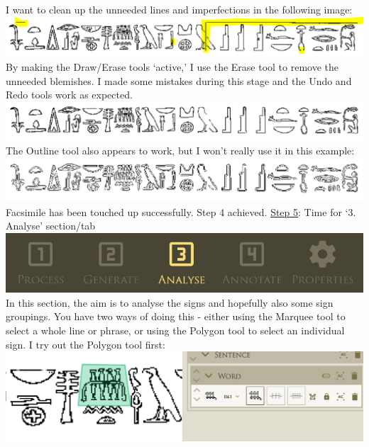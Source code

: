 \documentclass{article}
\begin{document}
\newline \break \noindent
I want to clean up the unneeded lines and imperfections in the following image:
\newline \break
\includegraphics[width=1.0\textwidth]{hiero_8.PNG}
By making the Draw/Erase tools `active,' I use the Erase tool to remove the unneeded blemishes. I made some mistakes during this stage and the Undo and Redo tools work as expected.
\newline \break
\includegraphics[width=1.0\textwidth]{hiero_9.PNG}
The Outline tool also appears to work, but I won't really use it in this example:
\newline \break
\includegraphics[width=1.0\textwidth]{hiero_10.PNG}
\break \noindent Facsimile has been touched up successfully.
\newline \break \noindent
Step 4 achieved.
\newline \break \noindent
\underline{Step 5}: Time for `3. Analyse' section/tab
\newline \break
\includegraphics[width=1.0\textwidth]{hiero_11.PNG}
\break \noindent
In this section, the aim is to analyse the signs and hopefully also some sign groupings. You have two ways of doing this - either using the Marquee tool to select a whole line or phrase, or using the Polygon tool to select an individual sign. I try out the Polygon tool first:
\newline \break
\includegraphics[width=1.0\textwidth]{hiero_12.PNG}
\end{document}
